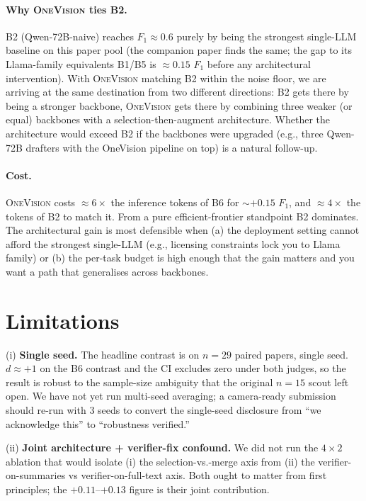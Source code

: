 \documentclass[11pt,a4paper]{article}
\begin{document}
\paragraph{Why \textsc{OneVision} ties B2.}
B2 (Qwen-72B-naive) reaches $F_1 \approx 0.6$ purely by being the
strongest single-LLM baseline on this paper pool (the companion
paper finds the same; the gap to its Llama-family equivalents B1/B5
is $\approx 0.15$ $F_1$ before any architectural intervention). With
\textsc{OneVision} matching B2 within the noise floor, we are
arriving at the same destination from two different directions: B2
gets there by being a stronger backbone, \textsc{OneVision} gets
there by combining three weaker (or equal) backbones with a
selection-then-augment architecture. Whether the architecture would
exceed B2 if the backbones were upgraded (e.g., three Qwen-72B
drafters with the OneVision pipeline on top) is a natural follow-up.

\paragraph{Cost.}
\textsc{OneVision} costs $\approx 6\times$ the inference tokens of B6
for $\sim+0.15$ $F_1$, and $\approx 4\times$ the tokens of B2 to
match it. From a pure efficient-frontier standpoint B2 dominates.
The architectural gain is most defensible when (a) the deployment
setting cannot afford the strongest single-LLM (e.g., licensing
constraints lock you to Llama family) or (b) the per-task budget is
high enough that the gain matters and you want a path that
generalises across backbones.

\section{Limitations}
\label{sec:limits}

(i) \textbf{Single seed.}
The headline contrast is on $n=29$ paired papers, single seed.
$d \approx +1$ on the B6 contrast and the CI excludes zero under
both judges, so the result is robust to the sample-size ambiguity
that the original $n=15$ scout left open. We have not yet run
multi-seed averaging; a camera-ready submission should re-run with
3 seeds to convert the single-seed disclosure from ``we acknowledge
this'' to ``robustness verified.''

(ii) \textbf{Joint architecture + verifier-fix confound.}
We did not run the $4 \times 2$ ablation that would isolate (i) the
selection-vs.-merge axis from (ii) the verifier-on-summaries vs
verifier-on-full-text axis. Both ought to matter from first
principles; the $+0.11$--$+0.13$ figure is their joint contribution.
\end{document}
